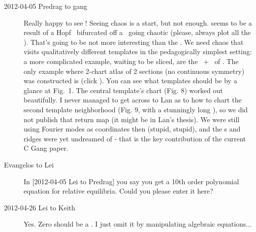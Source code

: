 \begin{description}
\item[2012-04-05 Predrag to {\twoMode} gang] Really happy to see
! Seeing chaos is a start, but not enough.
 seems to be a result of a Hopf \rpo\
bifurcated off a \reqv\ going chaotic (please, always plot all the
\reqva). That's going to be not more interesting than the \cLf. We need
chaos that visits qualitatively different templates in the pedagogically
simplest setting: a more complicated example, waiting to be sliced, are
the \eqva\ + \reqva\ of \refref{SCD07}. The only example where 2-chart
atlas of 2 sections (no continuous symmetry) was constructed is
 (click
).
You can see what templates should be by a glance at Fig.~1. The central
template's chart (Fig. 8) worked out beautifully. I never managed to get
across to Lan as to how to chart the second template neighborhood (Fig.
9, with a stunningly long \po), so we did not publish that return map (it
might be in Lan's thesis). We were still using Fourier modes as
coordinates then (stupid, stupid), and the \poincBord s and ridges were
yet undreamed of - that is the key contribution of the current C Gang
paper.

\item[Evangelos to Lei] In  [2012-04-05 Lei to Predrag] you say you get a
10th order polynomial equation for relative equilibria. Could you please
enter it here?

\item[2012-04-26 Lei to Keith] Yes. Zero should be a \eqv. I just
omit it by manipulating algebraic equations...

%



\end{description}
